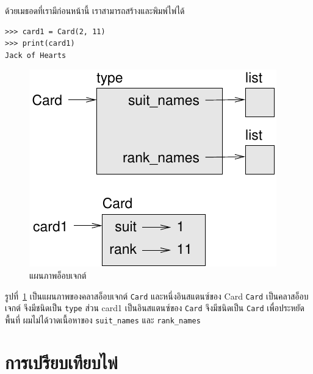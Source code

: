 
ด้วยเมธอดที่เรามีก่อนหน้านี้ เราสามารถสร้างและพิมพ์ไพ่ได้

\begin{verbatim}
>>> card1 = Card(2, 11)
>>> print(card1)
Jack of Hearts
\end{verbatim}

\begin{figure}
\centerline
{\includegraphics[scale=0.8]{figs/card1.pdf}}
\caption{แผนภาพอ็อบเจกต์}
\label{fig.card1}
\end{figure}


รูปที่~\ref{fig.card1} เป็นแผนภาพของคลาสอ็อบเจกต์ {\tt Card} และหนึ่งอินสแตนซ์ของ Card 
{\tt Card} เป็นคลาสอ็อบเจกต์  จึงมีชนิดเป็น {\tt type} 
ส่วน card1 เป็นอินสแตนซ์ของ {\tt Card} จึงมีชนิดเป็น {\tt Card} 
เพื่อประหยัดพื้นที่ ผมไม่ได้วาดเนื้อหาของ \verb"suit_names" และ \verb"rank_names"


\section{การเปรียบเทียบไพ่} %
\label{comparecard}

